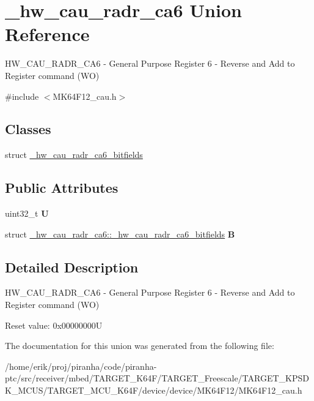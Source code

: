 \hypertarget{union__hw__cau__radr__ca6}{}\section{\+\_\+hw\+\_\+cau\+\_\+radr\+\_\+ca6 Union Reference}
\label{union__hw__cau__radr__ca6}


H\+W\+\_\+\+C\+A\+U\+\_\+\+R\+A\+D\+R\+\_\+\+C\+A6 -\/ General Purpose Register 6 -\/ Reverse and Add to Register command (WO)  




{\ttfamily \#include $<$M\+K64\+F12\+\_\+cau.\+h$>$}

\subsection*{Classes}
\begin{DoxyCompactItemize}
\item 
struct \hyperlink{struct__hw__cau__radr__ca6_1_1__hw__cau__radr__ca6__bitfields}{\+\_\+hw\+\_\+cau\+\_\+radr\+\_\+ca6\+\_\+bitfields}
\end{DoxyCompactItemize}
\subsection*{Public Attributes}
\begin{DoxyCompactItemize}
\item 
uint32\+\_\+t {\bfseries U}\hypertarget{union__hw__cau__radr__ca6_aa5536fdf219cdc474fa0f587cb8391c3}{}\label{union__hw__cau__radr__ca6_aa5536fdf219cdc474fa0f587cb8391c3}

\item 
struct \hyperlink{struct__hw__cau__radr__ca6_1_1__hw__cau__radr__ca6__bitfields}{\+\_\+hw\+\_\+cau\+\_\+radr\+\_\+ca6\+::\+\_\+hw\+\_\+cau\+\_\+radr\+\_\+ca6\+\_\+bitfields} {\bfseries B}\hypertarget{union__hw__cau__radr__ca6_a76edebc17b28404567fb80e905477a59}{}\label{union__hw__cau__radr__ca6_a76edebc17b28404567fb80e905477a59}

\end{DoxyCompactItemize}


\subsection{Detailed Description}
H\+W\+\_\+\+C\+A\+U\+\_\+\+R\+A\+D\+R\+\_\+\+C\+A6 -\/ General Purpose Register 6 -\/ Reverse and Add to Register command (WO) 

Reset value\+: 0x00000000U 

The documentation for this union was generated from the following file\+:\begin{DoxyCompactItemize}
\item 
/home/erik/proj/piranha/code/piranha-\/ptc/src/receiver/mbed/\+T\+A\+R\+G\+E\+T\+\_\+\+K64\+F/\+T\+A\+R\+G\+E\+T\+\_\+\+Freescale/\+T\+A\+R\+G\+E\+T\+\_\+\+K\+P\+S\+D\+K\+\_\+\+M\+C\+U\+S/\+T\+A\+R\+G\+E\+T\+\_\+\+M\+C\+U\+\_\+\+K64\+F/device/device/\+M\+K64\+F12/M\+K64\+F12\+\_\+cau.\+h\end{DoxyCompactItemize}
